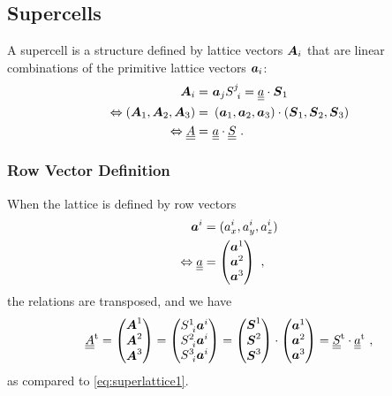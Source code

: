 \subsection{Supercells}
A supercell is a structure defined by lattice vectors $\boldsymbol{A}_i$ that are 
linear combinations of the primitive lattice vectors $\boldsymbol{a}_i$:
\begin{align}
\begin{split}
	\boldsymbol{A}_i =&~  \boldsymbol{a}_j S^{j}_{~i} = \underline{\underline{{a}}} \cdot \boldsymbol{S}_1  \\
	\Leftrightarrow \left( \boldsymbol{A}_1, \boldsymbol{A}_2, \boldsymbol{A}_3 \right)
	=&~ \left( \boldsymbol{a}_1, \boldsymbol{a}_2, \boldsymbol{a}_3 \right) 
	\cdot \left( \boldsymbol{S}_1, \boldsymbol{S}_2, \boldsymbol{S}_3 \right)\\
	\Leftrightarrow \underline{\underline{{A}}} =&~ \underline{\underline{{a}}} \cdot \underline{\underline{{S}}}
	~.
\end{split}
\label{eq:superlattice1}
\end{align}
\subsubsection*{Row Vector Definition}
When the lattice is defined by row vectors
\begin{align}
	\boldsymbol{a}^i &= (a^i_x, a^i_y, a^i_z) \\
	\Leftrightarrow \underline{\underline{{a}}} &= 
	\begin{pmatrix}
	\boldsymbol{a}^1 \\ \boldsymbol{a}^2 \\ \boldsymbol{a}^3
	\end{pmatrix}~,
\end{align}
the relations are transposed, and we have
\begin{align}
	{\underline{\underline{{A}}}}^{\mathrm t} = \begin{pmatrix}
	\boldsymbol{A}^1 \\ \boldsymbol{A}^2 \\ \boldsymbol{A}^3
	\end{pmatrix}
	= \begin{pmatrix}
	S^1_{~i} \boldsymbol{a}^i \\ S^2_{~i} \boldsymbol{a}^i \\ S^3_{~i} \boldsymbol{a}^i
	\end{pmatrix}
	= \begin{pmatrix}
	\boldsymbol{S}^1 \\ \boldsymbol{S}^2 \\ \boldsymbol{S}^3
	\end{pmatrix}
	\cdot
	\begin{pmatrix}
	\boldsymbol{a}^1 \\ \boldsymbol{a}^2 \\ \boldsymbol{a}^3
	\end{pmatrix}
	=
	{\underline{\underline{{S}}}}^{\mathrm t} \cdot {\underline{\underline{{a}}}}^{\mathrm t}
	~,
	\label{eq:superlattice2}
\end{align}
as compared to \eqref{eq:superlattice1}.

